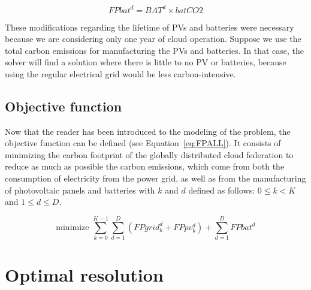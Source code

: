 \begin{equation} \label{eq:fbat}
   FPbat^d =  BAT^d \times batCO2
\end{equation}


These modifications regarding the lifetime of PVs and batteries were necessary because we are considering only one year of cloud operation. Suppose we use the total carbon emissions for manufacturing the PVs and batteries. In that case, the solver will find a solution where there is little to no PV or batteries, because using the regular electrical grid would be less carbon-intensive.  

\subsection{Objective function}
\label{sec:objectivefunction_ccgrid}

Now that the reader has been introduced to the modeling of the problem, the objective function can be defined (see Equation~\eqref{eq:FPALL}). It consists of minimizing the carbon footprint of the globally distributed cloud federation to reduce as much as possible the carbon emissions, which come from both the consumption of electricity from the power grid, as well as from the manufacturing of photovoltaic panels and batteries with $k$ and $d$ defined as follows: $0\leq k< K$ and $1\leq d\leq D$.

\begin{equation} \label{eq:FPALL}
\text{minimize }\sum_{k=0}^{K-1} \sum_{d=1}^D ( FPgrid^d_k +  FPpv^d_k) + \sum_{d=1}^D FPbat^d
\end{equation}


\section{Optimal resolution}
\label{sec:optimalresolution_ccgrid}


